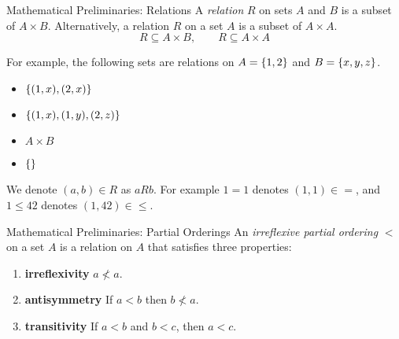 \clocktower{}

\begin{frame}{Mathematical Preliminaries: Relations}
    A \emph{relation} $R$ on sets $A$ and $B$ is a subset of $A \times B$.
    Alternatively, a relation $R$ on a set $A$ is a subset of $A \times A$.
    \[
      R \subseteq A \times B, \qquad R \subseteq A \times A
    \]

    \pause

    For example, the following sets are relations on $A = \left\{1, 2\right\}$ and $B =
    \left\{x, y, z\right\}$.
      \begin{itemize}
        \item $\left\{(1, x), (2, x)\right\}$
        \item $\left\{(1, x), (1, y), (2, z)\right\}$
        \item $A \times B$
        \item $\left\{\right\}$
      \end{itemize}

    \pause

    We denote $(a, b) \in R$ as $a R b$. For example $1 = 1$ denotes $(1, 1)
    \in =$, and $1 \leq 42$ denotes $(1, 42) \in \leq$.
\end{frame}

\begin{frame}{Mathematical Preliminaries: Partial Orderings}
  An \emph{irreflexive partial ordering} $<$ on a set $A$ is a relation on $A$
  that satisfies three properties:
  \begin{enumerate}
    \item \textbf{irreflexivity} $a \not< a$.
    \item \textbf{antisymmetry} If $a < b$ then $b \not< a$.
    \item \textbf{transitivity} If $a < b$ and $b < c$, then $a < c$.
  \end{enumerate}
\end{frame}

